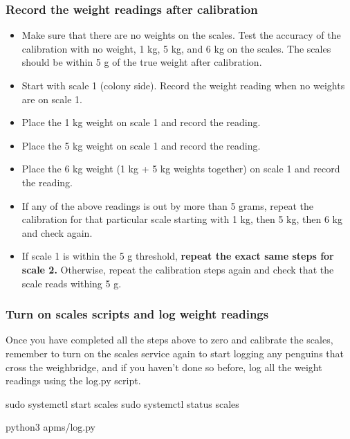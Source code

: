 \documentclass[
  letterpaper,
]{scrbook}
\newenvironment{Shaded}{\begin{snugshade}}{\end{snugshade}}
\newcommand{\ExtensionTok}[1]{\textcolor[rgb]{0.00,0.23,0.31}{#1}}
\newcommand{\FunctionTok}[1]{\textcolor[rgb]{0.28,0.35,0.67}{#1}}
\newcommand{\NormalTok}[1]{\textcolor[rgb]{0.00,0.23,0.31}{#1}}
\begin{document}
\subsubsection{Record the weight readings after
calibration}\label{record-the-weight-readings-after-calibration}

\begin{itemize}
\item
  Make sure that there are no weights on the scales. Test the accuracy
  of the calibration with no weight, 1 kg, 5 kg, and 6 kg on the scales.
  The scales should be within 5 g of the true weight after calibration.
\item
  Start with scale 1 (colony side). Record the weight reading when no
  weights are on scale 1.
\item
  Place the 1 kg weight on scale 1 and record the reading.
\item
  Place the 5 kg weight on scale 1 and record the reading.
\item
  Place the 6 kg weight (1 kg + 5 kg weights together) on scale 1 and
  record the reading.
\item
  If any of the above readings is out by more than 5 grams, repeat the
  calibration for that particular scale starting with 1 kg, then 5 kg,
  then 6 kg and check again.
\item
  If scale 1 is within the 5 g threshold, \textbf{repeat the exact same
  steps for scale 2.} Otherwise, repeat the calibration steps again and
  check that the scale reads withing 5 g.
\end{itemize}

\subsubsection{Turn on scales scripts and log weight
readings}\label{turn-on-scales-scripts-and-log-weight-readings}

Once you have completed all the steps above to zero and calibrate the
scales, remember to turn on the scales service again to start logging
any penguins that cross the weighbridge, and if you haven't done so
before, log all the weight readings using the log.py script.

\begin{Shaded}
\begin{Highlighting}[]
\FunctionTok{sudo}\NormalTok{ systemctl start scales}
\FunctionTok{sudo}\NormalTok{ systemctl status scales}

\ExtensionTok{python3}\NormalTok{ apms/log.py}
\end{Highlighting}
\end{Shaded}
\end{document}
